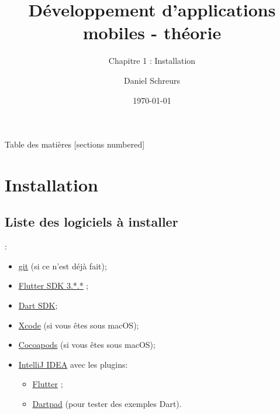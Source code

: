\documentclass[10pt]{beamer}
\title{Développement d'applications mobiles - théorie}
\subtitle{Chapitre 1 : Installation}
\date{\today}
\author{Daniel Schreurs}
\institute{Haute École de la Province de Liège}
\begin{document}
\maketitle

\begin{frame}[allowframebreaks]{Table des matières}
    [sections numbered]
    \tableofcontents
\end{frame}

\section{Installation}

\subsection{Liste des logiciels à installer}
\begin{frame}[fragile,t]{\secname : \subsecname}
    \begin{itemize}
        \item \href{https://git-scm.com/downloads}{git} (si ce n'est déjà fait);
        \item \href{https://flutter.dev/docs/get-started/install}{Flutter SDK 3.*.*} ;
        \item \href{https://dart.dev/get-dart}{Dart SDK};
        \item \href{https://itunes.apple.com/us/app/xcode/id497799835}{Xcode} (si vous êtes sous macOS);
        \item \href{https://guides.cocoapods.org/using/getting-started.html#installation}{Cocoapods} (si vous êtes sous macOS);
        \item \href{https://www.jetbrains.com/fr-fr/idea/download/#section=mac}{IntelliJ IDEA} avec les plugins:
              \begin{itemize}
                  \item \href{https://plugins.jetbrains.com/plugin/9212-flutter}{Flutter} ;
                  \item \href{https://plugins.jetbrains.com/plugin/16602-embedded-dartpad}{Dartpad} (pour tester des exemples Dart).
              \end{itemize}
    \end{itemize}
\end{frame}
\end{document}
